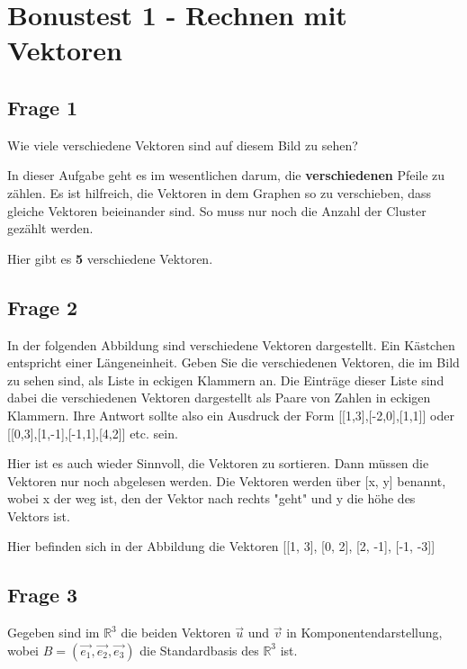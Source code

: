 \chapter{Bonustest 1 - Rechnen mit Vektoren}

\section{Frage 1}
Wie viele verschiedene Vektoren sind auf diesem Bild zu sehen?

In dieser Aufgabe geht es im wesentlichen darum, die \textbf{verschiedenen}
Pfeile zu zählen. Es ist hilfreich, die Vektoren in dem Graphen so zu
verschieben, dass gleiche Vektoren beieinander sind. So muss nur noch die
Anzahl der Cluster gezählt werden.


Hier gibt es \textbf{5} verschiedene Vektoren.

\section{Frage 2}
In der folgenden Abbildung sind verschiedene Vektoren dargestellt. Ein Kästchen
entspricht einer Längeneinheit. Geben Sie die verschiedenen Vektoren, die im
Bild zu sehen sind, als Liste in eckigen Klammern an. Die Einträge dieser Liste
sind dabei die verschiedenen Vektoren dargestellt als Paare von Zahlen in
eckigen Klammern. Ihre Antwort sollte also ein Ausdruck der Form
    [[1,3],[-2,0],[1,1]] oder [[0,3],[1,-1],[-1,1],[4,2]] etc. sein.

Hier ist es auch wieder Sinnvoll, die Vektoren zu sortieren. Dann müssen die
Vektoren nur noch abgelesen werden. Die Vektoren werden über [x, y] benannt,
wobei x der weg ist, den der Vektor nach rechts "geht" und y die höhe des
Vektors ist.


Hier befinden sich in der Abbildung die Vektoren [[1, 3], [0, 2], [2, -1], [-1,
                -3]]

\section{Frage 3}
Gegeben sind im $\mathbb{R}^3$ die beiden Vektoren $\vec{u}$ und $\vec{v}$ in
Komponentendarstellung, wobei $B = (\vec{e_1}, \vec{e_2}, \vec{e_3})$ die
Standardbasis des $\mathbb{R}^3$ ist.

